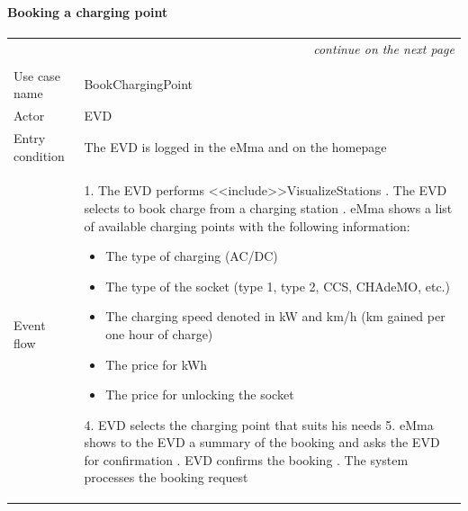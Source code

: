 \paragraph{Booking a charging point}
\begin{center}
    \begin{longtable}{p{4cm} p{11cm}}
    \multicolumn{2}{r}{\itshape{continue on the next page}}\\
    \endfoot 
    \\
    \endlastfoot
    \hline
     Use case name &  BookChargingPoint\\
     \hline
     Actor & EVD \\
     \hline
     Entry condition &   The EVD is logged in the eMma and on the homepage\\
     \hline
     Event flow &
        1. The EVD performs <<include>>VisualizeStations \newline
        2. The EVD selects to book charge from a charging station \newline
        3. eMma shows a list of available charging points with the following information:
            \begin{adjustwidth}{0.5cm}{}
                \begin{itemize}
                    \item The type of charging (AC/DC)
                    \item The type of the socket (type 1, type 2, CCS, CHAdeMO, etc.)
                    \item The charging speed denoted in kW and km/h (km gained per one hour of charge)
                    \item The price for kWh
                    \item The price for unlocking the socket
                \end{itemize}
            \end{adjustwidth}
        4. EVD selects the charging point that suits his needs \newline
        5. eMma shows to the EVD a summary of the booking and asks the EVD for confirmation \newline
        6. EVD confirms the booking \newline
        7. The system processes the booking request \newline

\end{longtable}
\end{center}
